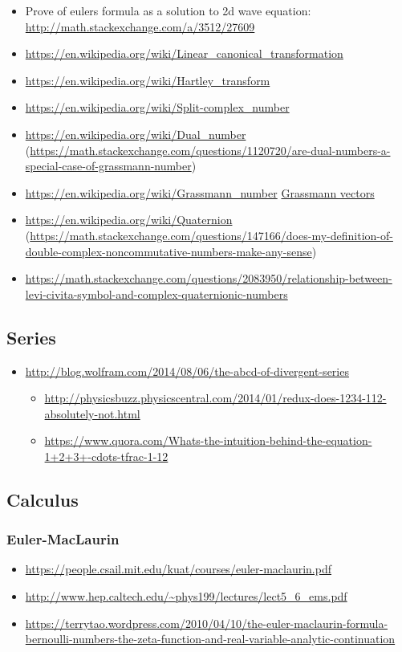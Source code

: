 \begin{itemize}
\item Prove of eulers formula as a solution to 2d wave equation: \url{http://math.stackexchange.com/a/3512/27609}
\item \url{https://en.wikipedia.org/wiki/Linear_canonical_transformation}
\item \url{https://en.wikipedia.org/wiki/Hartley_transform}
\item \url{https://en.wikipedia.org/wiki/Split-complex_number}
\item \url{https://en.wikipedia.org/wiki/Dual_number} (\url{https://math.stackexchange.com/questions/1120720/are-dual-numbers-a-special-case-of-grassmann-number})
\item \url{https://en.wikipedia.org/wiki/Grassmann_number} \href{https://math.stackexchange.com/questions/1108045/relationship-between-levi-civita-symbol-and-grassmann-numbers}{Grassmann vectors}
\item \url{https://en.wikipedia.org/wiki/Quaternion} (\url{https://math.stackexchange.com/questions/147166/does-my-definition-of-double-complex-noncommutative-numbers-make-any-sense})
\item \url{https://math.stackexchange.com/questions/2083950/relationship-between-levi-civita-symbol-and-complex-quaternionic-numbers}
\end{itemize}
\subsection{Series}

\begin{itemize}
\item \url{http://blog.wolfram.com/2014/08/06/the-abcd-of-divergent-series}
\begin{itemize}
\item \url{http://physicsbuzz.physicscentral.com/2014/01/redux-does-1234-112-absolutely-not.html}
\item \url{https://www.quora.com/Whats-the-intuition-behind-the-equation-1+2+3+-cdots-tfrac-1-12}
\end{itemize}
\end{itemize}

\subsection{Calculus}

\subsubsection{Euler-MacLaurin}
\begin{itemize}
\item \url{https://people.csail.mit.edu/kuat/courses/euler-maclaurin.pdf}
\item \url{http://www.hep.caltech.edu/~phys199/lectures/lect5_6_ems.pdf}
\item \url{https://terrytao.wordpress.com/2010/04/10/the-euler-maclaurin-formula-bernoulli-numbers-the-zeta-function-and-real-variable-analytic-continuation}
\end{itemize}

